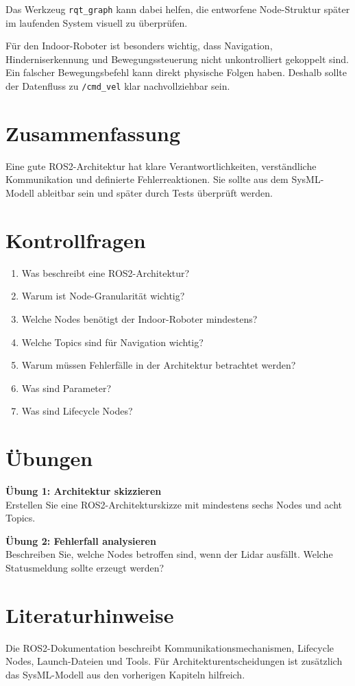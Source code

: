 Das Werkzeug \texttt{rqt\_graph} kann dabei helfen, die entworfene Node-Struktur später im laufenden System visuell zu überprüfen.

Für den Indoor-Roboter ist besonders wichtig, dass Navigation, Hinderniserkennung und Bewegungssteuerung nicht unkontrolliert gekoppelt sind. Ein falscher Bewegungsbefehl kann direkt physische Folgen haben. Deshalb sollte der Datenfluss zu \texttt{/cmd\_vel} klar nachvollziehbar sein.

\section{Zusammenfassung}
Eine gute ROS2-Architektur hat klare Verantwortlichkeiten, verständliche Kommunikation und definierte Fehlerreaktionen. Sie sollte aus dem SysML-Modell ableitbar sein und später durch Tests überprüft werden.

\section{Kontrollfragen}
\begin{enumerate}
    \item Was beschreibt eine ROS2-Architektur?
    \item Warum ist Node-Granularität wichtig?
    \item Welche Nodes benötigt der Indoor-Roboter mindestens?
    \item Welche Topics sind für Navigation wichtig?
    \item Warum müssen Fehlerfälle in der Architektur betrachtet werden?
    \item Was sind Parameter?
    \item Was sind Lifecycle Nodes?
\end{enumerate}

\section{Übungen}
\begin{uebungbox}
\textbf{Übung 1: Architektur skizzieren}\\
Erstellen Sie eine ROS2-Architekturskizze mit mindestens sechs Nodes und acht Topics.
\end{uebungbox}

\begin{uebungbox}
\textbf{Übung 2: Fehlerfall analysieren}\\
Beschreiben Sie, welche Nodes betroffen sind, wenn der Lidar ausfällt. Welche Statusmeldung sollte erzeugt werden?
\end{uebungbox}

\section{Literaturhinweise}
Die ROS2-Dokumentation \cite{ros2docs} beschreibt Kommunikationsmechanismen, Lifecycle Nodes, Launch-Dateien und Tools. Für Architekturentscheidungen ist zusätzlich das SysML-Modell aus den vorherigen Kapiteln hilfreich.
